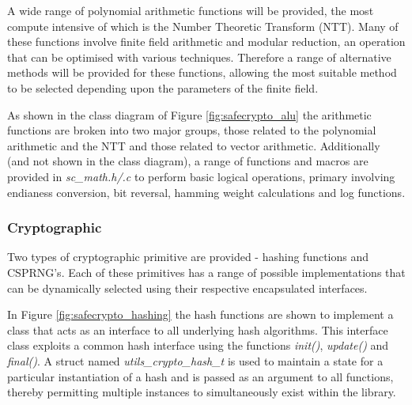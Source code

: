 A wide range of polynomial arithmetic functions will be provided, the most compute intensive of which is the Number Theoretic Transform (NTT). Many of these functions involve finite field arithmetic and modular reduction, an operation that can be optimised with various techniques. Therefore a range of alternative methods will be provided for these functions, allowing the most suitable method to be selected depending upon the parameters of the finite field.

As shown in the class diagram of Figure \ref{fig:safecrypto_alu} the arithmetic functions are broken into two major groups, those related to the polynomial arithmetic and the NTT and those related to vector arithmetic. Additionally (and not shown in the class diagram), a range of functions and macros are provided in \textit{sc\_math.h/.c} to perform basic logical operations, primary involving endianess conversion, bit reversal, hamming weight calculations and log functions.


\subsubsection{Cryptographic}

Two types of cryptographic primitive are provided - hashing functions and CSPRNG's. Each of these primitives has a range of possible implementations that can be dynamically selected using their respective encapsulated interfaces.

In Figure \ref{fig:safecrypto_hashing} the hash functions are shown to implement a class that acts as an interface to all underlying hash algorithms. This interface class exploits a common hash interface using the functions \textit{init()}, \textit{update()} and \textit{final()}. A struct named \textit{utils\_crypto\_hash\_t} is used to maintain a state for a particular instantiation of a hash and is passed as an argument to all functions, thereby permitting multiple instances to simultaneously exist within the library.

